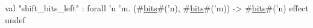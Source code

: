 val "shift_bits_left" : forall 'n 'm. (#\hyperref[zbits]{bits}#('n), #\hyperref[zbits]{bits}#('m)) -> #\hyperref[zbits]{bits}#('n) effect {undef}
